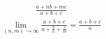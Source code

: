 \begin{gather*}
    \frac{a + nb + mc}{a + b + c}
\end{gather*}
\begin{gather*}
    \lim_{(n, m) \to \infty} \frac{a + b + c}{a + \frac{b}{n} + \frac{c}{m}} = \frac{a + b + c}{a}
\end{gather*}
    




